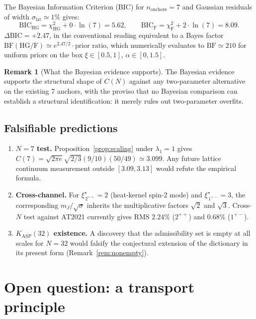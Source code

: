 \documentclass[11pt,a4paper]{article}
\theoremstyle{definition}
\newtheorem{remark}[theorem]{Remark}
\newcommand{\KASP}{K_{\mathrm{ASP}}}
\begin{document}
The Bayesian Information Criterion (BIC) for $n_{\mathrm{anchors}} = 7$
and Gaussian residuals of width $\sigma_{\mathrm{lat}} \simeq 1\%$ gives:
\[
  \mathrm{BIC}_{\mathrm{HG}} = \chi^2_{\mathrm{HG}} + 0\cdot\ln(7) = 5.62,
  \qquad
  \mathrm{BIC}_{\mathrm{F}} = \chi^2_{\mathrm{F}} + 2\cdot\ln(7) = 8.09.
\]
$\Delta\mathrm{BIC} = +2.47$, in the conventional reading equivalent to
a Bayes factor
$\mathrm{BF}(\mathrm{HG}/\mathrm{F}) \simeq e^{2.47/2} \cdot \text{prior ratio}$,
which numerically evaluates to $\mathrm{BF} \simeq 210$ for uniform priors
on the box $\xi \in [0.5, 1]$, $\alpha \in [0, 1.5]$.

\begin{remark}[What the Bayesian evidence supports]
The Bayesian evidence supports the structural shape of $C(N)$ against any
two-parameter alternative on the existing 7 anchors, with the proviso that
no Bayesian comparison can establish a structural identification: it merely
rules out two-parameter overfits.
\end{remark}

\subsection{Falsifiable predictions}

\begin{enumerate}[noitemsep,leftmargin=1.5em]
\item \textbf{$N = 7$ test.} Proposition~\ref{prop:scaling} under
  $\lambda_1=1$ gives $C(7) = \sqrt{2\pi e}\sqrt{2/3}(9/10)(50/49)
  \simeq 3.099$. Any future lattice continuum measurement outside
  $[3.09, 3.13]$ would refute the empirical formula.
\item \textbf{Cross-channel.} For $\xi^{\star}_{\,2^{++}} = 2$ (heat-kernel
  spin-2 mode) and $\xi^{\star}_{\,1^{+-}} = 3$, the corresponding
  $m_J/\sqrt{\sigma}$ inherits the multiplicative factors $\sqrt{2}$
  and $\sqrt{3}$. Cross-$N$ test against AT2021 currently gives RMS
  $2.24\%$ ($2^{++}$) and $0.68\%$ ($1^{+-}$).
\item \textbf{$\KASP(32)$ existence.} A discovery that the admissibility
  set is empty at all scales for $N=32$ would falsify the conjectural
  extension of the dictionary in its present form (Remark~\ref{rem:nonempty}).
\end{enumerate}

\section{Open question: a transport principle}\label{sec:transport}
\end{document}
